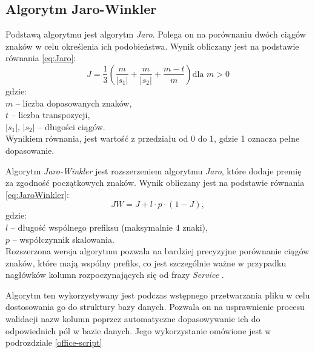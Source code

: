 \subsection{Algorytm Jaro-Winkler}
Podstawą algorytmu jest algorytm \emph{Jaro}. Polega on na porównaniu dwóch ciągów znaków w celu określenia ich podobieństwa. Wynik obliczany jest na podstawie równania \ref{eq:Jaro}:
\begin{equation}
    \label{eq:Jaro}
    J = \frac{1}{3} \left( \frac{m}{|s_1|} + \frac{m}{|s_2|} + \frac{m - t}{m} \right) \mbox{dla } m>0
\end{equation}
\noindent gdzie:\\
$m$ – liczba dopasowanych znaków,\\    $t$ – liczba transpozycji,\\    $|s_1|$, $|s_2|$ – długości ciągów.\\

\noindent Wynikiem równania, jest wartość z przedziału od 0 do 1, gdzie 1 oznacza pełne dopasowanie.

Algorytm \emph{Jaro-Winkler} jest rozszerzeniem algorytmu \emph{Jaro}, które dodaje premię za zgodność początkowych znaków. Wynik obliczany jest na podstawie równania \ref{eq:JaroWinkler}:
\begin{equation}
    \label{eq:JaroWinkler}
    JW = J + l \cdot p \cdot (1 - J),
\end{equation}
gdzie:\\
$l$ – długość wspólnego prefiksu (maksymalnie 4 znaki),\\ $p$ – współczynnik skalowania.\\

\noindent Rozszerzona wersja algorytmu pozwala na bardziej precyzyjne porównanie ciągów znaków, które mają wspólny prefiks, co jest szczególnie ważne w przypadku nagłówków kolumn rozpoczynających się od frazy \emph{Service} \cite{noauthor_jarowinkler_2024,vaid_comprehensive_2023}.

Algorytm ten wykorzystywany jest podczas wstępnego przetwarzania pliku w celu dostosowania go do struktury bazy danych. Pozwala on na usprawnienie procesu walidacji nazw kolumn poprzez automatyczne dopasowywanie ich do odpowiednich pól w bazie danych. Jego wykorzystanie omówione jest w podrozdziale \ref{office-script} 